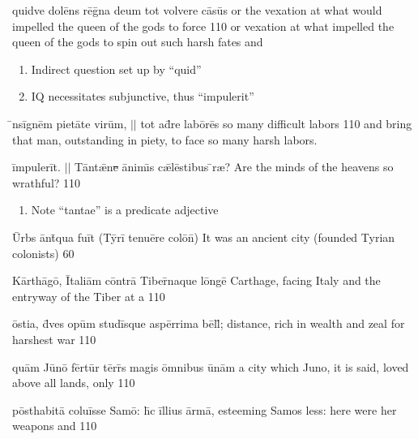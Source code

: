\documentclass[]{article}
\begin{document}
\latline
{quidve dol\={\macron e}ns r\={\macron e}g\={\macron{\i}}na deum tot volvere c\={\macron a}s\={\macron u}s}
{or the vexation at what would impelled the queen of the gods to force}
{110}
{or vexation at what impelled the queen of the gods to spin out such harsh fates and }
{
\begin{enumerate}
	\item Indirect question set up by ``quid''
	\item IQ necessitates subjunctive, thus ``impulerit''
\end{enumerate}
}

\newpage

\latline
{\={\macron{\i}}ns\=ign\=em p\-i\-et\={\macron a}t\-e v\-ir\=um, $||$ t\-ot \-ad\={\macron{\i}}r\-e l\-ab\={\macron o}r\={\macron e}s }
{so many difficult labors}	
{110}
{and bring that man, outstanding in piety, to face so many harsh labors.}
{}

\latline
{\=imp\-ul\-er\=it. $||$ T\=ant\={\ae}n\sout{e }\=anim\={\i}s c\={\ae}l\=est\-ib\-us \={\macron{\i}}r{\ae}?}
{Are the minds of the heavens so wrathful?}
{110}
{}
{
\begin{enumerate}
	\item Note ``tantae'' is a predicate adjective
\end{enumerate}
}

\latline
{\=Urbs \=ant\={\macron{\i}}qu\-a f\-u\=it (T\=yri\={\macron{\i}} t\-en\-u\={\macron e}r\-e c\-ol\={\macron o}n\={\macron{\i}})}
{It was an ancient city (founded Tyrian colonists)}
{60}
{}
{}

\newpage

\latline
{K\=arth\={\macron a}g\={\macron o}, \=Ita\-l\-i\=am c\=ontr\={\macron a} T\-ib\-er\={\macron{\i}}n\-aqu\-e l\=ong\={\macron e}}
{Carthage, facing Italy and the entryway of the Tiber at a }
{110}
{}
{}

\latline
{\={\macron o}st\-i\-a, d\={\macron{\i}}v\-es \-op\=um st\-ud\-i\={\macron{\i}}squ\-e \-asp\=err\-im\-a b\=ell\={\macron{\i}};}
{distance, rich in wealth and zeal for harshest war}
{110}
{}
{}

\latline
{qu\=am J\={\macron u}n\={\macron o} f\=ert\=ur t\=err\={\macron{\i}}s m\-ag\-is \=omn\-ib\-us \={\macron u}n\=am}
{a city which Juno, it is said, loved above all lands, only}
{110}
{}
{}

\latline
{p\=osth\-ab\-it\={\macron a} c\-ol\-u\=iss\-e S\-am\={\macron o}: h\={\macron{\i}}c \=ill\-i\-us \=arm\=a,}
{esteeming Samos less:  here were her weapons and}
{110}
{}
{}
\end{document}
